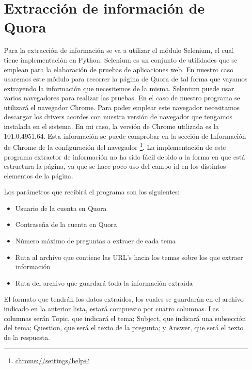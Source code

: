 \section{Extracción de información de Quora} \label{sec:extraccion_info}

Para la extracción de información se va a utilizar el módulo Selenium, el cual tiene implementación en Python. Selenium es un conjunto de utilidades que se emplean para la elaboración de pruebas de aplicaciones web. En nuestro caso usaremos este módulo para recorrer la página de Quora de tal forma que vayamos extrayendo la información que necesitemos de la misma. Selenium puede usar varios navegadores para realizar las pruebas. En el caso de nuestro programa se utilizará el navegador Chrome. Para poder emplear este navegador necesitamos descargar los \href{https://sites.google.com/chromium.org/driver/downloads?authuser=0}{drivers} acordes con nuestra versión de navegador que tengamos instalada en el sistema. En mi caso, la versión de Chrome utilizada es la 101.0.4951.64. Esta información se puede comprobar en la sección de Información de Chrome de la configuración del navegador \footnote{\url{chrome://settings/help}}. La implementación de este programa extractor de información no ha sido fácil debido a la forma en que está estructura la página, ya que se hace poco uso del campo id en los distintos elementos de la página.

Los parámetros que recibirá el programa son los siguientes:

\begin{itemize}
\item Usuario de la cuenta en Quora
\item Contraseña de la cuenta en Quora
\item Número máximo de preguntas a extraer de cada tema
\item Ruta al archivo que contiene las URL's hacia los temas sobre los que extraer información
\item Ruta del archivo que guardará toda la información extraída
\end{itemize}

El formato que tendrán los datos extraídos, los cuales se guardarán en el archivo indicado en la anterior lista, estará compuesto por cuatro columnas. Las columnas serán Topic, que indicará el tema; Subject, que indicará una subsección del tema; Question, que será el texto de la pregunta; y Answer, que será el texto de la respuesta.


